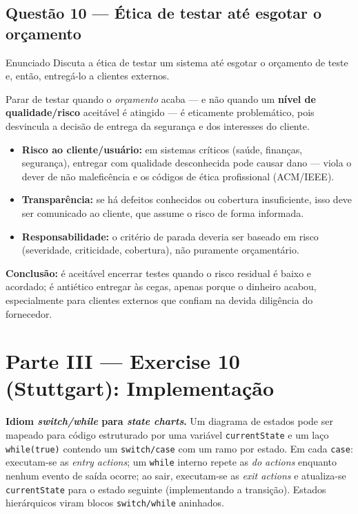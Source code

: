 \documentclass[11pt,a4paper]{article}
\begin{document}
\subsection*{Questão 10 — Ética de testar até esgotar o orçamento}
\begin{questao}{Enunciado}
Discuta a ética de testar um sistema até esgotar o orçamento de teste e, então,
entregá-lo a clientes externos.
\end{questao}
\begin{resposta}
Parar de testar quando o \emph{orçamento} acaba — e não quando um \textbf{nível de
qualidade/risco} aceitável é atingido — é eticamente problemático, pois
desvincula a decisão de entrega da segurança e dos interesses do cliente.
\begin{itemize}[nosep]
  \item \textbf{Risco ao cliente/usuário:} em sistemas críticos (saúde,
        finanças, segurança), entregar com qualidade desconhecida pode causar
        dano — viola o dever de não maleficência e os códigos de ética
        profissional (ACM/IEEE).
  \item \textbf{Transparência:} se há defeitos conhecidos ou cobertura
        insuficiente, isso deve ser comunicado ao cliente, que assume o risco de
        forma informada.
  \item \textbf{Responsabilidade:} o critério de parada deveria ser baseado em
        risco (severidade, criticidade, cobertura), não puramente orçamentário.
\end{itemize}
\textbf{Conclusão:} é aceitável encerrar testes quando o risco residual é baixo e
acordado; é antiético entregar às cegas, apenas porque o dinheiro acabou,
especialmente para clientes externos que confiam na devida diligência do
fornecedor.
\end{resposta}

\section{Parte III — Exercise 10 (Stuttgart): Implementação}
\begin{nota}
\textbf{Idiom \textit{switch/while} para \textit{state charts}.} Um diagrama de
estados pode ser mapeado para código estruturado por uma variável
\texttt{currentState} e um laço \texttt{while(true)} contendo um
\texttt{switch/case} com um ramo por estado. Em cada \texttt{case}: executam-se
as \emph{entry actions}; um \texttt{while} interno repete as \emph{do actions}
enquanto nenhum evento de saída ocorre; ao sair, executam-se as \emph{exit
actions} e atualiza-se \texttt{currentState} para o estado seguinte (implementando
a transição). Estados hierárquicos viram blocos \texttt{switch/while} aninhados.
\end{nota}
\end{document}
